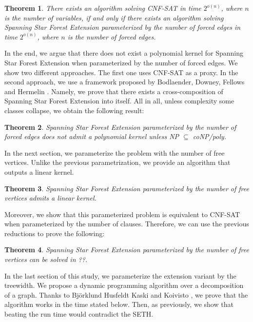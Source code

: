\documentclass[en]{pracamgr}
\newtheorem{theorem}{Theorem}
\theoremstyle{definition}
\newcommand{\ssfep}{{\sc Spanning Star Forest Extension}}
\newcommand{\cnfsat}{{\sc CNF-SAT}}
\begin{document}
\begin{theorem}\label{thm-ssfep-seth}
	There exists an algorithm solving \cnfsat{} in time $2^{o(n)}$, where $n$ is the number of variables, if and only if there exists an algorithm solving \ssfep{} parameterized by the number of forced edges in time $2^{o(n)}$, where $n$ is the number of forced edges.
\end{theorem}

\noindent
In the end, we argue that there does not exist a polynomial kernel for \ssfep{} when parameterized by the number of forced edges. We show two different approaches. The first one uses \cnfsat{} as a proxy. In the second approach, we use a framework proposed by Bodlaender, Downey, Fellows and Hermelin \cite{Bodlaender}. Namely, we prove that there exists a cross-composition of \ssfep{} into itself. All in all, unless complexity some classes collapse, we obtain the following result:

\begin{theorem}\label{thm-ssfep-nokernel}
	\ssfep{} parameterized by the number of forced edges does not admit a polynomial kernel unless NP $\subseteq$ coNP/poly.
\end{theorem}

In the next section, we parameterize the problem with the number of free vertices. Unlike the previous parametrization, we provide an algorithm that outputs a linear kernel.

\begin{theorem}\label{thm-ssfep-kernel}
	\ssfep{} parameterized by the number of free vertices admits a linear kernel.
\end{theorem}

\noindent
Moreover, we show that this parameterized problem is equivalent to \cnfsat{} when parameterized by the number of clauses. Therefore, we can use the previous reductions to prove the following:

\begin{theorem}\label{thm-ssfep-free-alg}
	\ssfep{} parameterized by the number of free vertices can be solved in ??.%
\end{theorem}

In the last section of this study, we parameterize the extension variant by the treewidth. We propose a dynamic programming algorithm over a decomposition of a graph. Thanks to Björklund Husfeldt Kaski and Koivisto \cite{Cover product}, we prove that the algorithm works in the time stated below. Then, as previously, we show that beating the run time would contradict the SETH.
\end{document}
